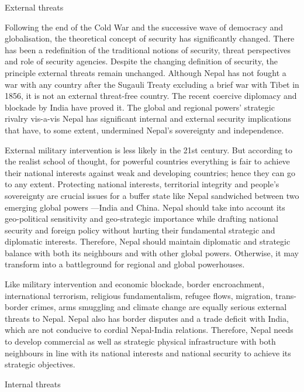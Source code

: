 \documentclass[
  openany]{book}
\begin{document}
External threats

Following the end of the Cold War and the successive wave of democracy and globalisation, the theoretical concept of security has significantly changed. There has been a redefinition of the traditional notions of security, threat perspectives and role of security agencies. Despite the changing definition of security, the principle external threats remain unchanged. Although Nepal has not fought a war with any country after the Sugauli Treaty excluding a brief war with Tibet in 1856, it is not an external threat-free country. The recent coercive diplomacy and blockade by India have proved it. The global and regional powers' strategic rivalry vis-a-vis Nepal has significant internal and external security implications that have, to some extent, undermined Nepal's sovereignty and independence.

External military intervention is less likely in the 21st century. But according to the realist school of thought, for powerful countries everything is fair to achieve their national interests against weak and developing countries; hence they can go to any extent. Protecting national interests, territorial integrity and people's sovereignty are crucial issues for a buffer state like Nepal sandwiched between two emerging global powers ---India and China. Nepal should take into account its geo-political sensitivity and geo-strategic importance while drafting national security and foreign policy without hurting their fundamental strategic and diplomatic interests. Therefore, Nepal should maintain diplomatic and strategic balance with both its neighbours and with other global powers. Otherwise, it may transform into a battleground for regional and global powerhouses.

Like military intervention and economic blockade, border encroachment, international terrorism, religious fundamentalism, refugee flows, migration, trans-border crimes, arms smuggling and climate change are equally serious external threats to Nepal. Nepal also has border disputes and a trade deficit with India, which are not conducive to cordial Nepal-India relations. Therefore, Nepal needs to develop commercial as well as strategic physical infrastructure with both neighbours in line with its national interests and national security to achieve its strategic objectives.

Internal threats
\end{document}
